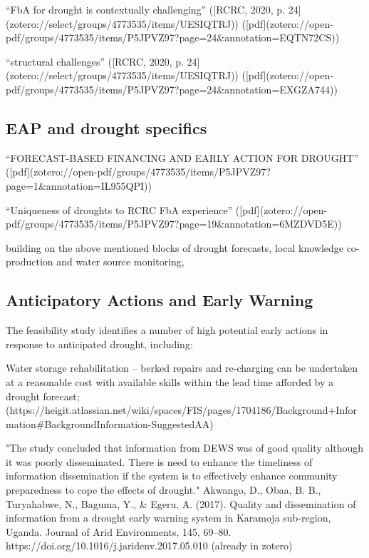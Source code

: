{“FbA for drought is contextually challenging” ([RCRC, 2020, p. 24](zotero://select/groups/4773535/items/UESIQTRJ)) ([pdf](zotero://open-pdf/groups/4773535/items/P5JPVZ97?page=24&annotation=EQTN72CS))

“structural challenges” ([RCRC, 2020, p. 24](zotero://select/groups/4773535/items/UESIQTRJ)) ([pdf](zotero://open-pdf/groups/4773535/items/P5JPVZ97?page=24&annotation=EXGZA744))


\subsection{EAP and drought specifics}
“FORECAST-BASED FINANCING AND EARLY ACTION FOR DROUGHT” ([pdf](zotero://open-pdf/groups/4773535/items/P5JPVZ97?page=1&annotation=IL955QPI))

“Uniqueness of droughts to RCRC FbA experience” ([pdf](zotero://open-pdf/groups/4773535/items/P5JPVZ97?page=19&annotation=6MZDVD5E))

building on the above mentioned blocks of drought forecasts, local knowledge co-production and water source monitoring, 


\subsection{Anticipatory Actions and Early Warning}
The feasibility study identifies a number of high potential early actions in response to anticipated drought, including:

Water storage rehabilitation – berked repairs and re-charging can be undertaken at a reasonable cost with available skills within the lead time afforded by a drought forecast; (https://heigit.atlassian.net/wiki/spaces/FIS/pages/1704186/Background+Information#BackgroundInformation-SuggestedAA)



"The study concluded that information from DEWS was of good quality although it was poorly disseminated. There is need to enhance the timeliness of information dissemination if the system is to effectively enhance community preparedness to cope the effects of drought." Akwango, D., Obaa, B. B., Turyahabwe, N., Baguma, Y., & Egeru, A. (2017). Quality and dissemination of information from a drought early warning system in Karamoja sub-region, Uganda. Journal of Arid Environments, 145, 69–80. https://doi.org/10.1016/j.jaridenv.2017.05.010 (already in zotero)




}
